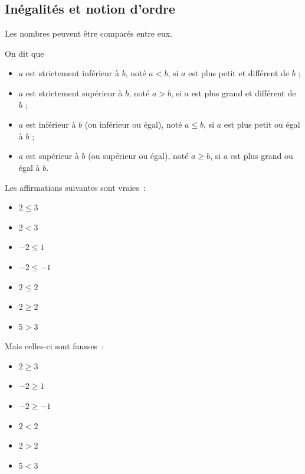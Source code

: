 \subsection{Inégalités et notion d'ordre}
\label{sec:inegalites}
\begin{frame}
  Les nombres peuvent être comparés entre eux.
  \begin{definition}
    On dit que
    \begin{itemize}
    \item \og \(a\) est strictement inférieur à \(b\)\fg{}, noté \(a < b\), si \(a\) est plus petit et différent de \(b\) ;
    \item \og \(a\) est strictement supérieur à \(b\)\fg{}, noté \(a > b\), si \(a\) est plus grand et différent de \(b\) ;
    \item \og \(a\) est inférieur à \(b\)\fg{} (ou \og inférieur ou égal\fg{}), noté \(a \leq b\), si \(a\) est plus petit ou égal à \(b\) ;
    \item \og \(a\) est supérieur à \(b\)\fg{} (ou \og supérieur ou égal\fg{}), noté \(a \geq b\), si \(a\) est plus grand ou égal à \(b\).
    \end{itemize}
  \end{definition}
\end{frame}
\begin{frame}
  \begin{example}
    Les affirmations suivantes sont vraies~:
    \begin{itemize}
    \item \(2 \leq 3\)
    \item \(2 < 3\)
    \item \(-2 \leq 1\)
    \item \(-2 \leq -1\)
    \item \(2 \leq 2\)
    \item \(2 \geq 2\)
    \item \(5 > 3\)
    \end{itemize}
  \end{example}
\end{frame}
\begin{frame}
  
\begin{example}
  Mais celles-ci sont fausses~:
  \begin{itemize}
  \item \(2 \geq 3\)
  \item \(-2 \geq 1\)
  \item \(-2 \geq -1\)
  \item \(2 < 2\)
  \item \(2 > 2\)
  \item \(5 < 3\)
  \end{itemize}
\end{example}
\end{frame}

